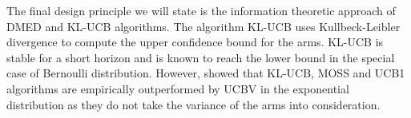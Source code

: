 	The final design principle we will state is the information theoretic approach of  DMED \cite{honda2010asymptotically} and KL-UCB \cite{garivier2011kl} algorithms. The algorithm KL-UCB uses Kullbeck-Leibler divergence to compute the upper confidence bound for the arms. KL-UCB is stable for a short horizon and is known to reach the \cite{lai1985asymptotically} lower bound in the special case of Bernoulli distribution. However, \cite{garivier2011kl} showed that KL-UCB, MOSS and UCB1 algorithms are  empirically outperformed by UCBV in the exponential distribution as they do not take the variance of the arms into consideration. 